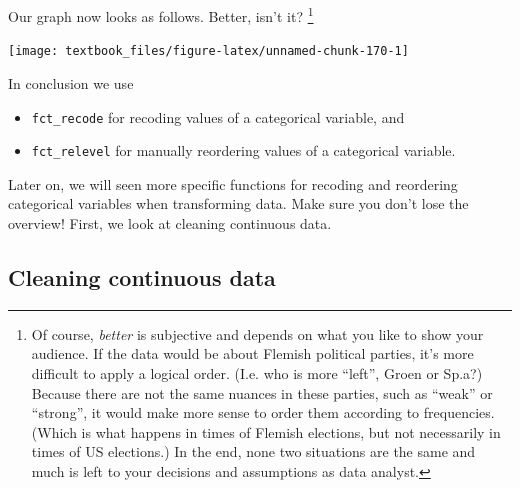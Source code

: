 \documentclass[]{tufte-book}
\newenvironment{Shaded}{}{}
\newcommand{\DataTypeTok}[1]{\textcolor[rgb]{0.56,0.13,0.00}{#1}}
\newcommand{\DecValTok}[1]{\textcolor[rgb]{0.25,0.63,0.44}{#1}}
\newcommand{\KeywordTok}[1]{\textcolor[rgb]{0.00,0.44,0.13}{\textbf{#1}}}
\newcommand{\NormalTok}[1]{#1}
\newcommand{\OperatorTok}[1]{\textcolor[rgb]{0.40,0.40,0.40}{#1}}
\newcommand{\StringTok}[1]{\textcolor[rgb]{0.25,0.44,0.63}{#1}}
\providecommand{\tightlist}{%
  \setlength{\itemsep}{0pt}\setlength{\parskip}{0pt}}
\begin{document}
Our graph now looks as follows. Better, isn't it? \footnote{Of course, \emph{better} is subjective and depends on what you like to show your audience. If the data would be about Flemish political parties, it's more difficult to apply a logical order. (I.e. who is more ``left'', Groen or Sp.a?) Because there are not the same nuances in these parties, such as ``weak'' or ``strong'', it would make more sense to order them according to frequencies. (Which is what happens in times of Flemish elections, but not necessarily in times of US elections.) In the end, none two situations are the same and much is left to your decisions and assumptions as data analyst.}

\begin{Shaded}
\end{Shaded}

\texttt{[image: textbook\_files/figure-latex/unnamed-chunk-170-1]}

In conclusion we use

\begin{itemize}
\tightlist
\item
  \texttt{fct\_recode} for recoding values of a categorical variable, and
\item
  \texttt{fct\_relevel} for manually reordering values of a categorical variable.
\end{itemize}

Later on, we will seen more specific functions for recoding and reordering categorical variables when transforming data. Make sure you don't lose the overview! First, we look at cleaning continuous data.

\hypertarget{cleaning-continuous-data}{%
\subsection{Cleaning continuous data}\label{cleaning-continuous-data}}
\end{document}
